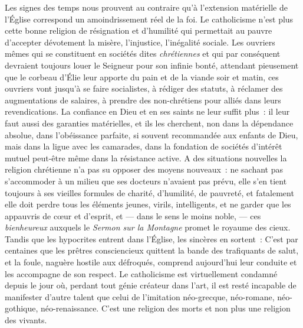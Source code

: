 \documentclass[french,twoside]{book} %
\begin{document}
Les signes des temps nous prouvent au contraire qu’à l’extension matérielle de l’Église correspond un amoindrissement réel de la foi. Le catholicisme n’est plus cette bonne religion de résignation  et d’humilité qui permettait au pauvre d’accepter dévotement la misère, l’injustice, l’inégalité sociale. Les ouvriers mêmes qui se constituent en sociétés dites \emph{chrétiennes} et qui par conséquent devraient toujours louer le Seigneur pour son infinie bonté, attendant pieusement que le corbeau d’Élie leur apporte du pain et de la viande soir et matin, ces ouvriers vont jusqu’à se faire socialistes, à rédiger des statuts, à réclamer des augmentations de salaires, à prendre des non-chrétiens pour alliés dans leurs revendications. La confiance en Dieu et en ses saints ne leur suffit plus : il leur faut aussi des garanties matérielles, et ils les cherchent, non dans la dépendance absolue, dans l’obéissance parfaite, si souvent recommandée  aux enfants de Dieu, mais dans la ligue avec les camarades, dans la fondation de sociétés d’intérêt mutuel peut-être même dans la résistance active. A des situations nouvelles la religion chrétienne n’a pas su opposer des moyens nouveaux : ne sachant pas s’accommoder à un milieu que ses docteurs n’avaient pas prévu, elle s’en tient toujours à ses vieilles formules de charité, d’humilité, de pauvreté, et fatalement elle doit perdre tous les éléments jeunes, virils, intelligents, et ne garder que les appauvris de cœur et d’esprit, et — dans le sens le moins noble, — ces \emph{bienheureux} auxquels le \emph{Sermon sur la Montagne} promet le royaume des cieux. Tandis que les hypocrites entrent dans l’Église, les sincères en sortent : C’est  par centaines que les prêtres consciencieux quittent la bande des trafiquants de salut, et la foule, naguère hostile aux défroqués, comprend aujourd’hui leur conduite et les accompagne de son respect. Le catholicisme est virtuellement condamné depuis le jour où, perdant tout génie créateur dans l’art, il est resté incapable de manifester d’autre talent que celui de l’imitation néo-grecque, néo-romane, néo-gothique, néo-renaissance. C’est une religion des morts et non plus une religion des vivants.\par
\end{document}
